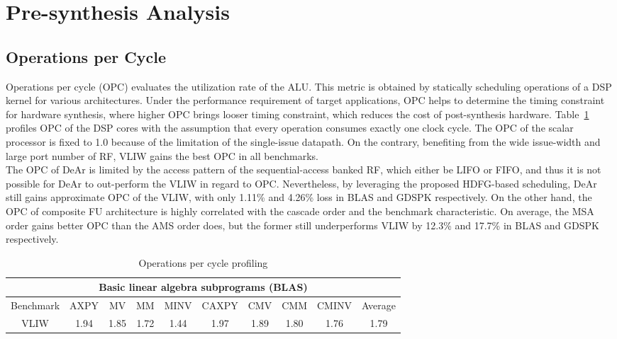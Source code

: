 \section{Pre-synthesis Analysis}
{
    \subsection{Operations per Cycle}
    Operations per cycle (OPC) evaluates the utilization rate of the ALU.
    This metric is obtained by statically scheduling operations of a DSP kernel for various architectures.
    Under the performance requirement of target applications, OPC helps to determine the timing constraint for hardware synthesis, 
    where higher OPC brings looser timing constraint, which reduces the cost of post-synthesis hardware.
    Table~\ref{tab:opc} profiles OPC of the DSP cores with the assumption that every operation consumes exactly one clock cycle.
    The OPC of the scalar processor is fixed to 1.0 because of the limitation of the single-issue datapath.
    On the contrary, benefiting from the wide issue-width and large port number of RF, VLIW gains the best OPC in all benchmarks.
    \\\indent
    The OPC of DeAr is limited by the access pattern of the sequential-access banked RF, which either be LIFO or FIFO, 
    and thus it is not possible for DeAr to out-perform the VLIW in regard to OPC.
    Nevertheless, by leveraging the proposed HDFG-based scheduling,  
    DeAr still gains approximate OPC of the VLIW, with only 1.11\% and 4.26\% loss in BLAS and GDSPK respectively.
    On the other hand, the OPC of composite FU architecture is highly correlated with the cascade order and the benchmark characteristic. 
    On average, the MSA order gains better OPC than the AMS order does, 
    but the former still underperforms VLIW by 12.3\% and 17.7\% in BLAS and GDSPK respectively.
    \begin{table}[!ht]
        \centering
        \caption{Operations per cycle profiling}
        \label{tab:opc}
        \resizebox{\columnwidth}{!}
        {
            \begin{tabular}{|c|c|c|c|c|c|c|c|c|c|}
                \hline
                \multicolumn{10}{|c|}{\textbf{Basic linear algebra subprograms (BLAS)}} \\ \hline
                Benchmark  &  AXPY  &  MV  &  MM  &  MINV  &  CAXPY  &  CMV  &  CMM  &  CMINV  &  Average \\ \hline 
                VLIW  &   1.94  &   1.85  &   1.72  &   1.44  &   1.97  &   1.89  &   1.80  &   1.76  &   1.79     \\ \hline 

\end{tabular}}
\end{table}}
